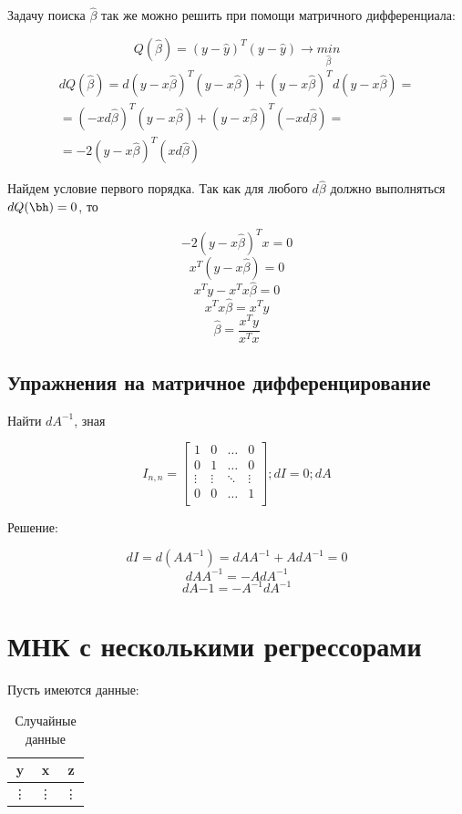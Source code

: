 \documentclass[12pt]{article} %
\theoremstyle{definition} %
\def \hb{\hat{\beta}}
\def \hy{\hat{y}}
\begin{document}
Задачу поиска $\hb$ так же можно решить при помощи матричного дифференциала:

\[
Q(\hb) = \left( y-\hy\right)^T\left( y-\hy\right) \rightarrow \underset{\hb}{min}
\]
\begin{eqnarray*}
dQ(\hb) = d( y-x\hb)^T( y-x\hb) + ( y-x\hb)^Td( y-x\hb) = \\
=(-xd\hb)^T( y-x\hb) + (y-x\hb)^T(-xd\hb)=\\
=-2(y-x\hb)^T(xd\hb)
\end{eqnarray*}

Найдем условие первого порядка. Так как для любого $d\hb$ должно выполняться $dQ(\bh)=0$, то

\[
-2(y-x\hb)^Tx = 0
\]
\[
x^T(y-x\hb) = 0
\]
\[
x^Ty-x^Tx\hb = 0
\]
\[
x^Tx\hb = x^Ty
\]
\[
\hb = \frac{x^Ty}{x^Tx}
\]

\subsection{Упражнения на матричное дифференцирование}

Найти $dA^{-1}$, зная 

\[
I_{n,n} =  \begin{bmatrix}
           1 & 0 & \hdots & 0 \\
           0 & 1 & \hdots & 0 \\
           \vdots & \vdots & \ddots & \vdots \\
            0 & 0 & \hdots & 1 \\
         \end{bmatrix};
dI = 0;
dA
\]

Решение:

\[
dI = d(AA^{-1}) = dAA^{-1} + AdA^{-1} = 0
\]
\[
dAA^{-1} = -AdA^{-1}
\]
\[
dA{-1} = -A^{-1}dA^{-1}
\]

\section{МНК с несколькими регрессорами}

Пусть имеются данные:

\begin{table}[h!]
    \centering
    \begin{tabular}{c|c|c}
        \hline
        y & x & z \\
        \hline
        \vdots & \vdots & \vdots
    \end{tabular}
    \caption{Случайные данные}
    \label{second_table}
\end{table}
\end{document}
